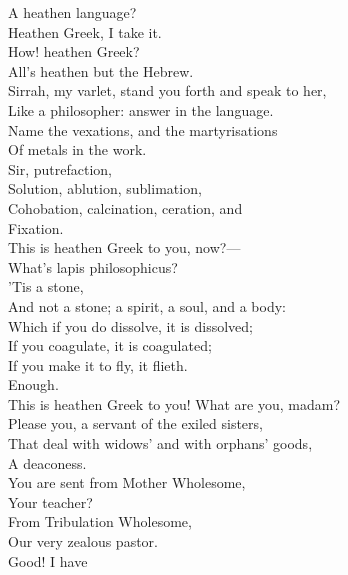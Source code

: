 \documentclass[a4paper,oneside,12pt]{memoir}
\begin{document}
\begin{drama*}
\subtlespeaks A heathen language?\\
\persecutionspeaks {} Heathen Greek, I take it.\\
\subtlespeaks How! heathen Greek?\\
\persecutionspeaks {} All's heathen but the Hebrew.\\
\subtlespeaks Sirrah, my varlet, stand you forth and speak to her,\\
Like a philosopher: answer in the language.\\
Name the vexations, and the martyrisations\\
Of metals in the work.\\
\facespeaks {} Sir, putrefaction,\\
Solution, ablution, sublimation,\\
Cohobation, calcination, ceration, and\\
Fixation.\\
\subtlespeaks {} This is heathen Greek to you, now?---\\
What's lapis philosophicus?\\
\facespeaks {} 'Tis a stone,\\
And not a stone; a spirit, a soul, and a body:\\
Which if you do dissolve, it is dissolved;\\
If you coagulate, it is coagulated;\\
If you make it to fly, it flieth.\\
\subtlespeaks {} Enough.\\
This is heathen Greek to you! What are you, madam?\\
\persecutionspeaks Please you, a servant of the exiled sisters,\\
That deal with widows' and with orphans' goods,\\
A deaconess.\\
\subtlespeaks {} You are sent from Mother Wholesome,\\
Your teacher?\\
\persecutionspeaks {} From Tribulation Wholesome,\\
Our very zealous pastor.\\
\subtlespeaks {} Good! I have\\

\end{drama*}
\end{document}
